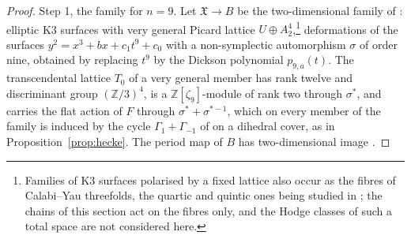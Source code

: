 \documentclass[11pt,reqno]{amsart}
\numberwithin{equation}{section}
\theoremstyle{plain}
\theoremstyle{definition}
\newcommand{\ZZ}{\mathbb{Z}}
\begin{document}
\begin{proof}
Step 1, the family for $n=9$. Let $\mathfrak{X}\to B$ be the two-dimensional family of \cite[\S5.6]{vGS25}: elliptic K3 surfaces with very general Picard lattice $U\oplus A_{2}^{4}$,\footnote{Families of K3 surfaces polarised by a fixed lattice also occur as the fibres of Calabi--Yau threefolds, the quartic and quintic ones being studied in \cite{Bha22}; the chains of this section act on the fibres only, and the Hodge classes of such a total space are not considered here.} deformations of the surfaces $y^{2}=x^{3}+bx+c_{1}t^{9}+c_{0}$ with a non-symplectic automorphism $\sigma$ of order nine, obtained by replacing $t^{9}$ by the Dickson polynomial $p_{9,a}(t)$. The transcendental lattice $T_{0}$ of a very general member has rank twelve and discriminant group $(\ZZ/3)^{4}$, is a $\ZZ[\zeta_{9}]$-module of rank two through $\sigma^{*}$, and carries the flat action of $F$ through $\sigma^{*}+\sigma^{*-1}$, which on every member of the family is induced by the cycle $\Gamma_{1}+\Gamma_{-1}$ of \cite[\S4.8]{vGS25} on a dihedral cover, as in Proposition~\ref{prop:hecke}. The period map of $B$ has two-dimensional image \cite[\S5.6]{vGS25}.


\end{proof}
\end{document}
